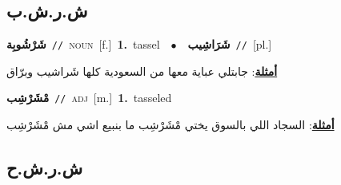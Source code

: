 \documentclass[10pt,a4paper,twoside]{article} %
\begin{document}
\begin{multicols}{2}
\vspace{-3mm}
\subsection*{\color{blue}\foreignlanguage{arabic}{ش.ر.ش.ب}\color{blue}{}} 

{\setlength\topsep{0pt}\textbf{\foreignlanguage{arabic}{شَرْشُوبِة}}\ {\color{gray}\texttt{//}\color{black}}\ \textsc{noun}\ [f.]\ \textbf{1.}~tassel\ \ $\bullet$\ \ \setlength\topsep{0pt}\textbf{\foreignlanguage{arabic}{شَرَاشِيب}}\ {\color{gray}\texttt{//}\color{black}}\ [pl.]\  \begin{flushright}\color{gray}\foreignlanguage{arabic}{\textbf{\underline{\foreignlanguage{arabic}{أمثلة}}}: جابتلي عباية معها من السعودية كلها شَراشيب وبرّاق}\end{flushright}\color{black}} \vspace{2mm}

{\setlength\topsep{0pt}\textbf{\foreignlanguage{arabic}{مْشَرْشِب}}\ {\color{gray}\texttt{//}\color{black}}\ \textsc{adj}\ [m.]\ \textbf{1.}~tasseled\  \begin{flushright}\color{gray}\foreignlanguage{arabic}{\textbf{\underline{\foreignlanguage{arabic}{أمثلة}}}: السجاد اللي بالسوق يختي مْشَرْشِب ما بنبيع اشي مش مْشَرْشِب}\end{flushright}\color{black}} \vspace{2mm}

\vspace{-3mm}
\subsection*{\color{blue}\foreignlanguage{arabic}{ش.ر.ش.ح}\color{blue}{}} 


\end{multicols}
\end{document}
